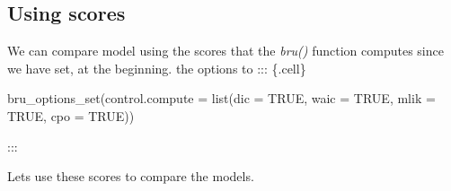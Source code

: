 \documentclass[
  letterpaper,
  DIV=11,
  numbers=noendperiod]{scrartcl}
\newenvironment{Shaded}{\begin{snugshade}}{\end{snugshade}}
\newcommand{\AttributeTok}[1]{\textcolor[rgb]{0.40,0.45,0.13}{#1}}
\newcommand{\ConstantTok}[1]{\textcolor[rgb]{0.56,0.35,0.01}{#1}}
\newcommand{\FunctionTok}[1]{\textcolor[rgb]{0.28,0.35,0.67}{#1}}
\newcommand{\NormalTok}[1]{\textcolor[rgb]{0.00,0.23,0.31}{#1}}
\begin{document}
\subsection{Using scores}\label{using-scores}

We can compare model using the scores that the \emph{bru()} function
computes since we have set, at the beginning. the options to :::
\{.cell\}

\begin{Shaded}
\begin{Highlighting}[]
\FunctionTok{bru\_options\_set}\NormalTok{(}\AttributeTok{control.compute =} \FunctionTok{list}\NormalTok{(}\AttributeTok{dic =} \ConstantTok{TRUE}\NormalTok{,}
                                       \AttributeTok{waic =} \ConstantTok{TRUE}\NormalTok{,}
                                       \AttributeTok{mlik =} \ConstantTok{TRUE}\NormalTok{,}
                                       \AttributeTok{cpo =} \ConstantTok{TRUE}\NormalTok{))}
\end{Highlighting}
\end{Shaded}

:::

Lets use these scores to compare the models.
\end{document}

